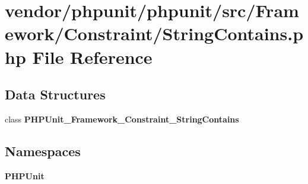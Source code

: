 \section{vendor/phpunit/phpunit/src/\+Framework/\+Constraint/\+String\+Contains.php File Reference}
\label{_string_contains_8php}
\subsection*{Data Structures}
\begin{DoxyCompactItemize}
\item 
class {\bf P\+H\+P\+Unit\+\_\+\+Framework\+\_\+\+Constraint\+\_\+\+String\+Contains}
\end{DoxyCompactItemize}
\subsection*{Namespaces}
\begin{DoxyCompactItemize}
\item 
 {\bf P\+H\+P\+Unit}
\end{DoxyCompactItemize}
